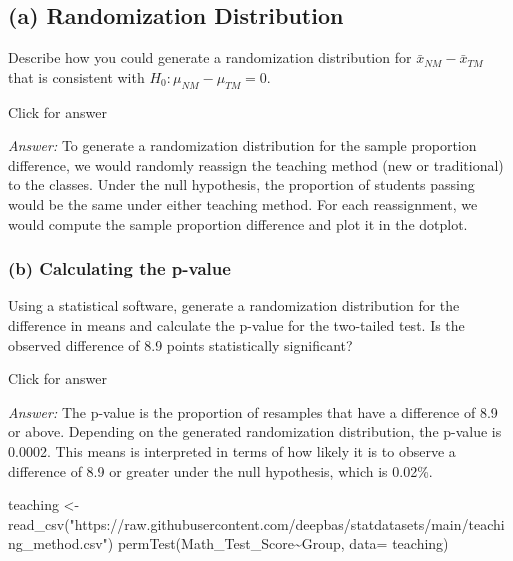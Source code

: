 \documentclass[
]{book}
\newenvironment{Shaded}{\begin{snugshade}}{\end{snugshade}}
\newcommand{\AttributeTok}[1]{\textcolor[rgb]{0.77,0.63,0.00}{#1}}
\newcommand{\FunctionTok}[1]{\textcolor[rgb]{0.00,0.00,0.00}{#1}}
\newcommand{\NormalTok}[1]{#1}
\newcommand{\OtherTok}[1]{\textcolor[rgb]{0.56,0.35,0.01}{#1}}
\newcommand{\SpecialCharTok}[1]{\textcolor[rgb]{0.00,0.00,0.00}{#1}}
\newcommand{\StringTok}[1]{\textcolor[rgb]{0.31,0.60,0.02}{#1}}
\begin{document}
\hypertarget{a-randomization-distribution-1}{%
\subsection{(a) Randomization Distribution}\label{a-randomization-distribution-1}}

Describe how you could generate a randomization distribution for \(\bar{x}_{NM} - \bar{x}_{TM}\) that is consistent with \(H_0: \mu_{NM} - \mu_{TM} = 0\).

Click for answer

\emph{Answer:} To generate a randomization distribution for the sample proportion difference, we would randomly reassign the teaching method (new or traditional) to the classes. Under the null hypothesis, the proportion of students passing would be the same under either teaching method. For each reassignment, we would compute the sample proportion difference and plot it in the dotplot.

\hypertarget{b-calculating-the-p-value-1}{%
\subsubsection{(b) Calculating the p-value}\label{b-calculating-the-p-value-1}}

Using a statistical software, generate a randomization distribution for the difference in means and calculate the p-value for the two-tailed test. Is the observed difference of 8.9 points statistically significant?

Click for answer

\emph{Answer:} The p-value is the proportion of resamples that have a difference of 8.9 or above. Depending on the generated randomization distribution, the p-value is 0.0002. This means is interpreted in terms of how likely it is to observe a difference of 8.9 or greater under the null hypothesis, which is 0.02\%.

\begin{Shaded}
\begin{Highlighting}[]
\NormalTok{teaching }\OtherTok{\textless{}{-}} \FunctionTok{read\_csv}\NormalTok{(}\StringTok{"https://raw.githubusercontent.com/deepbas/statdatasets/main/teaching\_method.csv"}\NormalTok{)}
\FunctionTok{permTest}\NormalTok{(Math\_Test\_Score}\SpecialCharTok{\textasciitilde{}}\NormalTok{Group, }\AttributeTok{data=}\NormalTok{ teaching)}
\end{Highlighting}
\end{Shaded}
\end{document}
